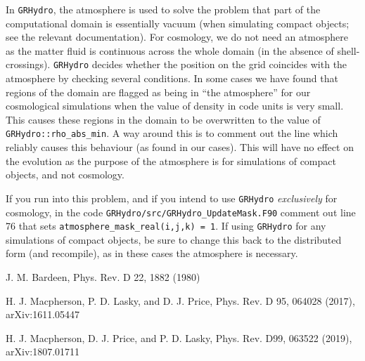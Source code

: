 In {\tt GRHydro}, the atmosphere is used to solve the problem that part of the computational domain is essentially vacuum (when simulating compact objects; see the relevant documentation). For cosmology, we do not need an atmosphere as the matter fluid is continuous across the whole domain (in the absence of shell-crossings). {\tt GRHydro} decides whether the position on the grid coincides with the atmosphere by checking several conditions. In some cases we have found that regions of the domain are flagged as being in ``the atmosphere'' for our cosmological simulations when the value of density in code units is very small. This causes these regions in the domain to be overwritten to the value of {\tt GRHydro::rho\_abs\_min}. A way around this is to comment out the line which reliably causes this behaviour (as found in our cases). This will have no effect on the evolution as the purpose of the atmosphere is for simulations of compact objects, and not cosmology. 

If you run into this problem, and if you intend to use {\tt GRHydro} \textit{exclusively} for cosmology, in the code {\tt GRHydro/src/GRHydro\_UpdateMask.F90} comment out line 76 that sets {\tt atmosphere\_mask\_real(i,j,k) = 1}. If using {\tt GRHydro} for any simulations of compact objects, be sure to change this back to the distributed form (and recompile), as in these cases the atmosphere is necessary. 



\begin{thebibliography}{9}

 J. M. Bardeen, Phys. Rev. D 22, 1882 (1980)

 H. J. Macpherson, P. D. Lasky, and D. J. Price, Phys. Rev. D 95, 064028 (2017), arXiv:1611.05447

 H. J. Macpherson, D. J. Price, and P. D. Lasky, Phys. Rev. D99, 063522 (2019), arXiv:1807.01711

\end{thebibliography}


